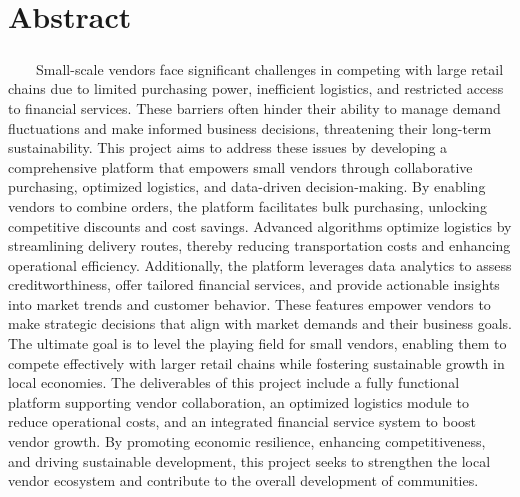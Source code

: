 \chapter*{Abstract}
\vspace{1.5cm}
\paragraph{}\ \ \ \ Small-scale vendors face significant challenges in competing with large retail chains due to limited purchasing power, inefficient logistics, and restricted access to financial services. These barriers often hinder their ability to manage demand fluctuations and make informed business decisions, threatening their long-term sustainability. This project aims to address these issues by developing a comprehensive platform that empowers small vendors through collaborative purchasing, optimized logistics, and data-driven decision-making. By enabling vendors to combine orders, the platform facilitates bulk purchasing, unlocking competitive discounts and cost savings. Advanced algorithms optimize logistics by streamlining delivery routes, thereby reducing transportation costs and enhancing operational efficiency. Additionally, the platform leverages data analytics to assess creditworthiness, offer tailored financial services, and provide actionable insights into market trends and customer behavior. These features empower vendors to make strategic decisions that align with market demands and their business goals. The ultimate goal is to level the playing field for small vendors, enabling them to compete effectively with larger retail chains while fostering sustainable growth in local economies. The deliverables of this project include a fully functional platform supporting vendor collaboration, an optimized logistics module to reduce operational costs, and an integrated financial service system to boost vendor growth. By promoting economic resilience, enhancing competitiveness, and driving sustainable development, this project seeks to strengthen the local vendor ecosystem and contribute to the overall development of communities.